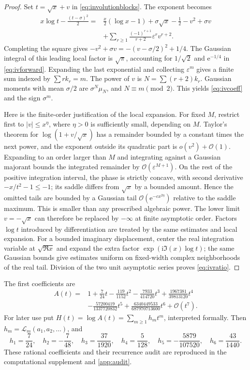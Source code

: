 \documentclass[11pt,a4paper]{article}
\theoremstyle{definition}
\theoremstyle{remark}
\newcommand{\ee}{\mathrm e}
\newcommand{\ii}{\mathrm i}
\newcommand{\OO}{\mathcal O}
\newcommand{\LogC}{\mathcal L}
\numberwithin{equation}{section}
\begin{document}
\begin{proof}
Set $t=\sqrt x+v$ in \eqref{eq:involutionblocks}. The exponent becomes
\begin{align*}
 x\log t-\frac{(t-\sigma)^2}{2}
 ={}&\frac x2(\log x-1)+\sigma\sqrt x-\frac12-v^2+\sigma v\\
 &+\sum_{r\ge1}\frac{(-1)^{r+1}}{r+2}\varepsilon^r v^{r+2}.
\end{align*}
Completing the square gives $-v^2+\sigma v=-(v-\sigma/2)^2+1/4$. The Gaussian integral of this leading local factor is $\sqrt\pi$, accounting for $1/\sqrt2$ and $\ee^{-1/4}$ in \eqref{eq:ivforward}. Expanding the last exponential and collecting $\varepsilon^m$ gives a finite sum indexed by $\sum rk_r=m$. The power of $v$ is $N=\sum(r+2)k_r$. Gaussian moments with mean $\sigma/2$ are $\sigma^N\mu_N$, and $N\equiv m\pmod2$. This yields \eqref{eq:ivcoeff} and the sign $\sigma^m$.

Here is the finite-order justification of the local expansion. For fixed $M$, restrict first to $|v|\le x^\eta$, where $\eta>0$ is sufficiently small, depending on $M$. Taylor's theorem for $\log(1+v/\sqrt x)$ has a remainder bounded by a constant times the next power, and the exponent outside its quadratic part is $o(v^2)+\OO(1)$. Expanding to an order larger than $M$ and integrating against a Gaussian majorant bounds the integrated remainder by $\OO(\varepsilon^{M+1})$. On the rest of the positive integration interval, the phase is strictly concave, with second derivative $-x/t^2-1\le-1$; its saddle differs from $\sqrt x$ by a bounded amount. Hence the omitted tails are bounded by a Gaussian tail $\OO(\ee^{-c x^{2\eta}})$ relative to the saddle maximum. This is smaller than any prescribed algebraic power. The lower limit $v=-\sqrt x$ can therefore be replaced by $-\infty$ at finite asymptotic order. Factors $\log t$ introduced by differentiation are treated by the same estimates and local expansion. For a bounded imaginary displacement, center the real integration variable at $\sqrt{\Re x}$ and expand the extra factor $\exp(\ii\Im(x)\log t)$; the same Gaussian bounds give estimates uniform on fixed-width complex neighborhoods of the real tail. Division of the two unit asymptotic series proves \eqref{eq:ivratio}.
\end{proof}

The first coefficients are
\begin{align}
 A(t)={}&1+\frac7{24}t-\frac{119}{1152}t^2
 -\frac{7933}{414720}t^3+\frac{1967381}{39813120}t^4\nonumber\\
 &-\frac{57200419}{1337720832}t^5
 +\frac{6340449533}{687970713600}t^6+\OO(t^7).
 \label{eq:ivfirstcoeff}
\end{align}
For later use put $H(t)=\log A(t)=\sum_{m\ge1}h_mt^m$, interpreted formally. Then $h_m=\LogC_m(a_1,a_2,\ldots)$, and
\begin{equation}
 h_1=\frac7{24},\quad h_2=-\frac7{48},\quad
 h_3=\frac{37}{1920},\quad h_4=\frac5{128},\quad
 h_5=-\frac{5879}{107520},\quad h_6=\frac{43}{1440}.
 \label{eq:ivlogcoeff}
\end{equation}
These rational coefficients and their recurrence audit are reproduced in the computational supplement and \cref{app:audit}.
\end{document}
